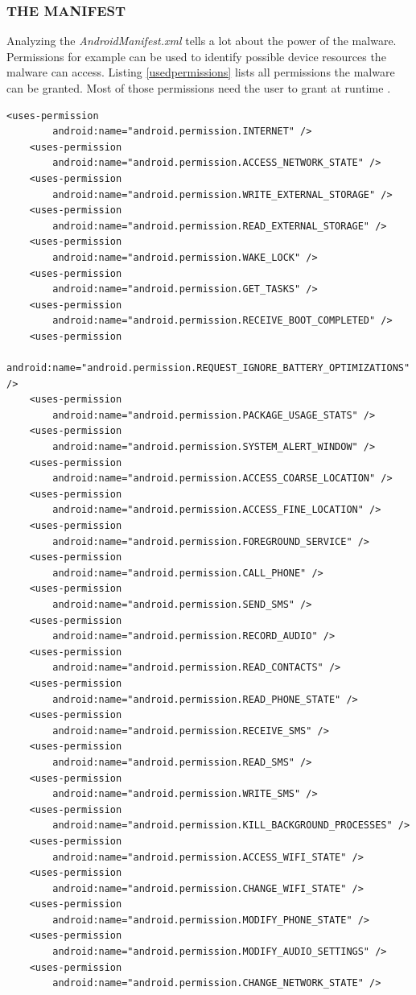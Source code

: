 \documentclass[10pt,titlepage]{article}
\begin{document}
\newpage
\subsubsection{THE MANIFEST} \label{manifest}
Analyzing the \textit{AndroidManifest.xml} tells a lot about the power of the malware. Permissions for example can be used to identify possible device resources the malware can access. Listing \ref{usedpermissions} lists all permissions the malware can be granted. Most of those permissions need the user to grant at runtime \cite[guide/topics/permissions/overview]{AndroidDev}.

\begin{lstlisting}[label=usedpermissions,caption=Permissions defined in the Manifest of the malware,frame=tb]
	<uses-permission
        android:name="android.permission.INTERNET" />
    <uses-permission
        android:name="android.permission.ACCESS_NETWORK_STATE" />
    <uses-permission
        android:name="android.permission.WRITE_EXTERNAL_STORAGE" />
    <uses-permission
        android:name="android.permission.READ_EXTERNAL_STORAGE" />
    <uses-permission
        android:name="android.permission.WAKE_LOCK" />
    <uses-permission
        android:name="android.permission.GET_TASKS" />
    <uses-permission
        android:name="android.permission.RECEIVE_BOOT_COMPLETED" />
    <uses-permission
        android:name="android.permission.REQUEST_IGNORE_BATTERY_OPTIMIZATIONS" />
    <uses-permission
        android:name="android.permission.PACKAGE_USAGE_STATS" />
    <uses-permission
        android:name="android.permission.SYSTEM_ALERT_WINDOW" />
    <uses-permission
        android:name="android.permission.ACCESS_COARSE_LOCATION" />
    <uses-permission
        android:name="android.permission.ACCESS_FINE_LOCATION" />
    <uses-permission
        android:name="android.permission.FOREGROUND_SERVICE" />
    <uses-permission
        android:name="android.permission.CALL_PHONE" />
    <uses-permission
        android:name="android.permission.SEND_SMS" />
    <uses-permission
        android:name="android.permission.RECORD_AUDIO" />
    <uses-permission
        android:name="android.permission.READ_CONTACTS" />
    <uses-permission
        android:name="android.permission.READ_PHONE_STATE" />
    <uses-permission
        android:name="android.permission.RECEIVE_SMS" />
    <uses-permission
        android:name="android.permission.READ_SMS" />
    <uses-permission
        android:name="android.permission.WRITE_SMS" />
    <uses-permission
        android:name="android.permission.KILL_BACKGROUND_PROCESSES" />
    <uses-permission
        android:name="android.permission.ACCESS_WIFI_STATE" />
    <uses-permission
        android:name="android.permission.CHANGE_WIFI_STATE" />
    <uses-permission
        android:name="android.permission.MODIFY_PHONE_STATE" />
    <uses-permission
        android:name="android.permission.MODIFY_AUDIO_SETTINGS" />
    <uses-permission
        android:name="android.permission.CHANGE_NETWORK_STATE" />
\end{lstlisting}
\end{document}
